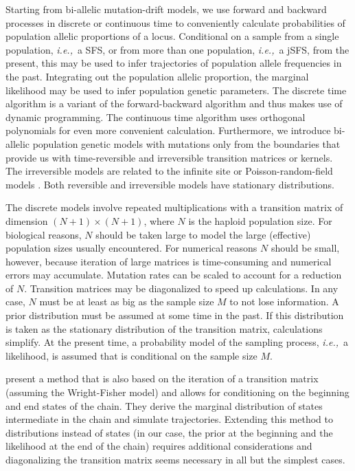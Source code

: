 \documentclass[preprint]{elsarticle}
\newcommand\ie{{\it i.e.,}}
\begin{document}
Starting from bi-allelic mutation-drift models, we use forward and backward processes in discrete or continuous time to conveniently calculate probabilities of population allelic proportions of a locus. Conditional on a sample from a single population, \ie\ a SFS, or from more than one population, \ie\ a jSFS, from the present, this may be used to infer trajectories of population allele frequencies in the past. Integrating out the population allelic proportion, the marginal likelihood may be used to infer population genetic parameters. The discrete time algorithm is a variant of the forward-backward algorithm and thus makes use of dynamic programming. The continuous time algorithm uses orthogonal polynomials for even more convenient calculation. Furthermore, we introduce bi-allelic population genetic models with mutations only from the boundaries that provide us with time-reversible and irreversible transition matrices or kernels. The irreversible models are related to the infinite site \citep{Kimu69,Evan07} or Poisson-random-field models \citep{Sawy92}. Both reversible and irreversible models have stationary distributions.

The discrete models involve repeated multiplications with a transition matrix of dimension $(N+1)\times(N+1)$, where $N$ is the haploid population size. For biological reasons, $N$ should be taken large to model the large (effective) population sizes usually encountered. For numerical reasons $N$ should be small, however, because iteration of large matrices is time-consuming and numerical errors may accumulate. Mutation rates can be scaled to account for a reduction of $N$. Transition matrices may be diagonalized to speed up calculations. In any case, $N$ must be at least as big as the sample size $M$ to not lose information. A prior distribution must be assumed at some time in the past. If this distribution is taken as the stationary distribution of the transition matrix, calculations simplify. At the present time, a probability model of the sampling process, \ie\  a likelihood, is assumed that is conditional on the sample size $M$.

\citet{Zhao14} present a method that is also based on the iteration of a transition matrix (assuming the Wright-Fisher model) and allows for conditioning on the beginning and end states of the chain. They derive the marginal distribution of states intermediate in the chain and simulate trajectories. Extending this method to distributions instead of states (in our case, the prior at the beginning and the likelihood at the end of the chain) requires additional considerations and diagonalizing the transition matrix seems necessary in all but the simplest cases. 
\end{document}
